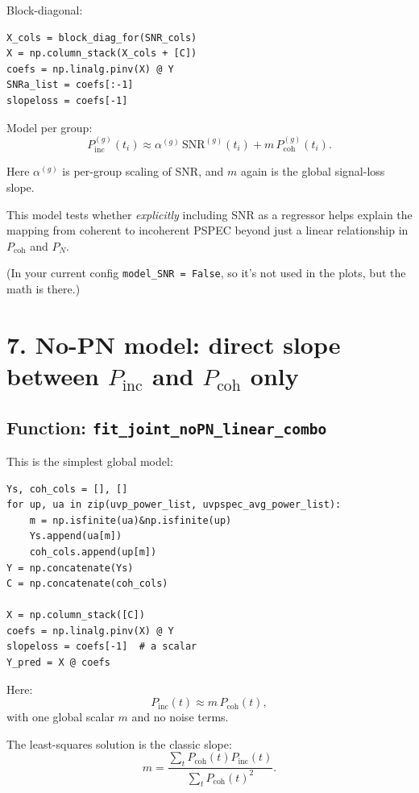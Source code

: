 \documentclass[11pt]{article}
\begin{document}
Block-diagonal:

\begin{verbatim}
X_cols = block_diag_for(SNR_cols)
X = np.column_stack(X_cols + [C])
coefs = np.linalg.pinv(X) @ Y
SNRa_list = coefs[:-1]
slopeloss = coefs[-1]
\end{verbatim}

Model per group:
\[
  P_{\mathrm{inc}}^{(g)}(t_i) \approx
  \alpha^{(g)} \, \mathrm{SNR}^{(g)}(t_i)
  + m \, P_{\mathrm{coh}}^{(g)}(t_i).
\]

Here $\alpha^{(g)}$ is per-group scaling of SNR, and $m$ again is the global signal-loss slope.

This model tests whether \emph{explicitly} including SNR as a regressor helps explain the mapping from coherent to incoherent PSPEC beyond just a linear relationship in $P_{\mathrm{coh}}$ and $P_N$.

(In your current config \texttt{model\_SNR = False}, so it’s not used in the plots, but the math is there.)

\section*{7. No-PN model: direct slope between \texorpdfstring{$P_{\mathrm{inc}}$}{P\_inc} and \texorpdfstring{$P_{\mathrm{coh}}$}{P\_coh} only}

\subsection*{Function: \texttt{fit\_joint\_noPN\_linear\_combo}}

This is the simplest global model:

\begin{verbatim}
Ys, coh_cols = [], []
for up, ua in zip(uvp_power_list, uvpspec_avg_power_list):
    m = np.isfinite(ua)&np.isfinite(up)
    Ys.append(ua[m])
    coh_cols.append(up[m])
Y = np.concatenate(Ys)
C = np.concatenate(coh_cols)

X = np.column_stack([C])
coefs = np.linalg.pinv(X) @ Y
slopeloss = coefs[-1]  # a scalar
Y_pred = X @ coefs
\end{verbatim}

Here:
\[
  P_{\mathrm{inc}}(t) \approx m \, P_{\mathrm{coh}}(t),
\]
with one global scalar $m$ and no noise terms.

The least-squares solution is the classic slope:
\[
  m = \frac{\sum_t P_{\mathrm{coh}}(t) P_{\mathrm{inc}}(t)}
           {\sum_t P_{\mathrm{coh}}(t)^2}.
\]
\end{document}
